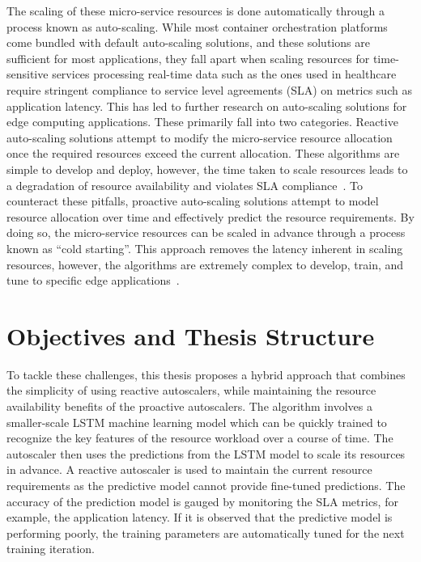 The scaling of these micro-service resources is done automatically through a process known as auto-scaling. While most container orchestration platforms come bundled with default auto-scaling solutions, and these solutions are sufficient for most applications, they fall apart when scaling resources for time-sensitive services processing real-time data such as the ones used in healthcare require stringent compliance to service level agreements (SLA) on metrics such as application latency. This has led to further research on auto-scaling solutions for edge computing applications. These primarily fall into two categories. Reactive auto-scaling solutions attempt to modify the micro-service resource allocation once the required resources exceed the current allocation. These algorithms are simple to develop and deploy, however, the time taken to scale resources leads to a degradation of resource availability and violates SLA compliance~\cite{podolskiy2018iaas}. To counteract these pitfalls, proactive auto-scaling solutions attempt to model resource allocation over time and effectively predict the resource requirements. By doing so, the micro-service resources can be scaled in advance through a process known as ``cold starting''. This approach removes the latency inherent in scaling resources, however, the algorithms are extremely complex to develop, train, and tune to specific edge applications~\cite{straesser2022not}.

\section{Objectives and Thesis Structure}
\label{sec:ch1-problem-overview}

To tackle these challenges, this thesis proposes a hybrid approach that combines the simplicity of using reactive autoscalers, while maintaining the resource availability benefits of the proactive autoscalers. The algorithm involves a smaller-scale LSTM machine learning model which can be quickly trained to recognize the key features of the resource workload over a course of time. The autoscaler then uses the predictions from the LSTM model to scale its resources in advance. A reactive autoscaler is used to maintain the current resource requirements as the predictive model cannot provide fine-tuned predictions. The accuracy of the prediction model is gauged by monitoring the SLA metrics, for example, the application latency. If it is observed that the predictive model is performing poorly, the training parameters are automatically tuned for the next training iteration.\par

